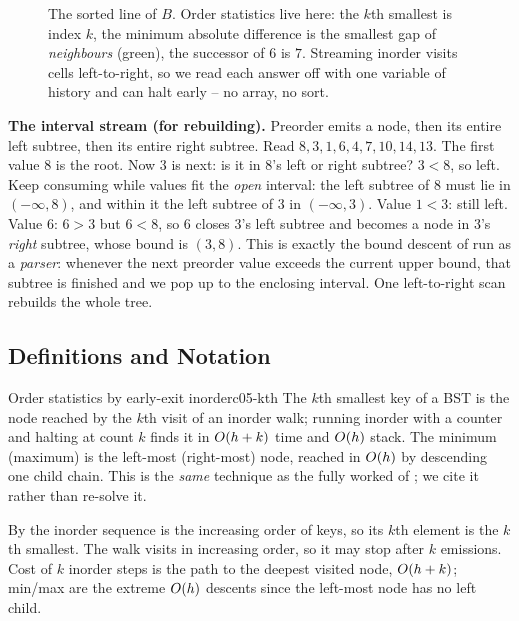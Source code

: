 \begin{figure}[H]
\centering
{}
\caption{The sorted line of $B$. Order statistics live here: the $k$th smallest is index $k$, the
minimum absolute difference is the smallest gap of \emph{neighbours} (green), the successor of $6$ is
$7$. Streaming inorder visits cells left-to-right, so we read each answer off with one variable of
history and can halt early -- no array, no sort.}\label{fig:c05-line}
\end{figure}

\textbf{The interval stream (for rebuilding).} Preorder emits a node, then its entire left subtree,
then its entire right subtree. Read $8,3,1,6,4,7,10,14,13$. The first value $8$ is the root. Now
$3$ is next: is it in $8$'s left or right subtree? $3<8$, so left. Keep consuming while values fit
the \emph{open} interval: the left subtree of $8$ must lie in $(-\infty,8)$, and within it the left
subtree of $3$ in $(-\infty,3)$. Value $1<3$: still left. Value $6$: $6>3$ but $6<8$, so $6$ closes
$3$'s left subtree and becomes a node in $3$'s \emph{right} subtree, whose bound is $(3,8)$. This is
exactly the bound descent of  run as a \emph{parser}: whenever the next preorder
value exceeds the current upper bound, that subtree is finished and we pop up to the enclosing
interval. One left-to-right scan rebuilds the whole tree.

\subsection{Definitions and Notation}

\begin{proposition}{Order statistics by early-exit inorder}{c05-kth}
The $k$th smallest key of a BST is the node reached by the $k$th visit of an inorder walk; running
inorder with a counter and halting at count $k$ finds it in $O(h+k)$ time and $O(h)$ stack.
The minimum (maximum) is the left-most (right-most) node, reached in $O(h)$ by descending one
child chain. This is the \emph{same} technique as the fully worked  of
; we cite it rather than re-solve it.
\end{proposition}
\begin{proofbox}
By  the inorder sequence is the increasing order of keys, so its $k$th element is
the $k$th smallest. The walk visits in increasing order, so it may stop after $k$ emissions. Cost of
$k$ inorder steps is the path to the deepest visited node, $O(h+k)$; min/max are the extreme
$O(h)$ descents since the left-most node has no left child. \end{proofbox}

